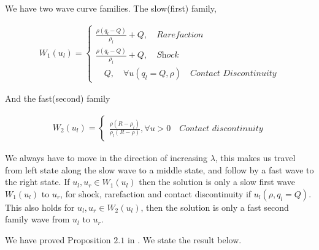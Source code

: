 \documentclass{article}
\numberwithin{equation}{section}
\begin{document}
We have two wave curve families. The slow(first) family, 

\begin{align}
     W_1(u_l) = \begin{cases}
     \frac{\rho( q_l - Q)}{\rho_l} + Q, \quad \textit{Rarefaction}\\
     \frac{\rho( q_l - Q)}{\rho_l} + Q,  \quad \textit{Shock} \\
     \quad Q, \quad \forall u(q_l=Q, \rho) \quad \textit{Contact Discontinuity}
     \end{cases}
\end{align}

And the fast(second) family 

\begin{align}
     W_2(u_l) = \begin{cases}
     \frac{\rho( R - \rho_l)}{\rho_l( R - \rho)}, \forall u > 0  \quad \textit{Contact discontinuity}
     \end{cases}
\end{align}

We always have to move in the direction of increasing $\lambda$, this makes us travel from left state along the slow wave to a middle state, and follow by a fast wave to the right state. If $u_l, u_r \in W_1(u_l)$ then the solution is only a slow first wave $W_1(u_l)$ to $u_r$, for shock, rarefaction and contact discontinuity if $u_l(\rho, q_l = Q)$. This also holds for $u_l, u_r \in W_2(u_l)$, then the solution is only a fast second family wave from $u_l$ to $u_r$. 

We have proved Proposition $2.1$ in \cite{Colombo2002}. We state the result below.
\end{document}
